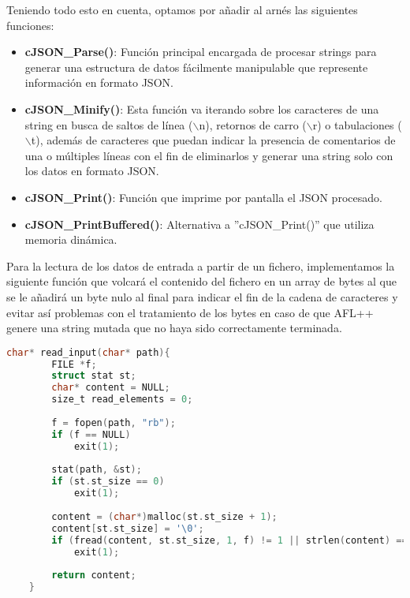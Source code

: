 Teniendo todo esto en cuenta, optamos por añadir al arnés las siguientes funciones:
\begin{itemize}
    \item \textbf{cJSON\_Parse()}: Función principal encargada de procesar strings para generar una estructura de datos fácilmente manipulable que represente
    información en formato JSON. 
    \item \textbf{cJSON\_Minify()}: Esta función va iterando sobre los
    caracteres de una string en busca de saltos de línea ($\backslash$n), retornos de carro ($\backslash$r) o tabulaciones ($\backslash$t), además de caracteres que 
    puedan indicar la presencia de comentarios de una o múltiples líneas con el fin de eliminarlos y generar una string solo con los datos en formato JSON.
    \item \textbf{cJSON\_Print()}: Función que imprime por pantalla el JSON procesado.
    \item \textbf{cJSON\_PrintBuffered()}: Alternativa a ''cJSON\_Print()'' que utiliza memoria dinámica.
\end{itemize}

Para la lectura de los datos de entrada a partir de un fichero, implementamos la siguiente función que volcará el contenido del fichero en un array de bytes al que se le 
añadirá un byte nulo al final para indicar el fin de la cadena de caracteres y evitar así problemas con el tratamiento de los bytes en caso de que AFL++ genere una string mutada 
que no haya sido correctamente terminada.

\begin{lstlisting}[language=C, caption=Lectura de datos desde fichero en el arnés., captionpos=b,
    frame=single, breaklines, showstringspaces=false]
    char* read_input(char* path){
        FILE *f;
        struct stat st;
        char* content = NULL;
        size_t read_elements = 0;
    
        f = fopen(path, "rb");
        if (f == NULL)
            exit(1);
    
        stat(path, &st);
        if (st.st_size == 0)
            exit(1);
    
        content = (char*)malloc(st.st_size + 1);
        content[st.st_size] = '\0';                                                 // Avoid heap-buffer-overflow in strlen with non null terminated strings
        if (fread(content, st.st_size, 1, f) != 1 || strlen(content) == 0)
            exit(1);
        
        return content;
    }
\end{lstlisting}

